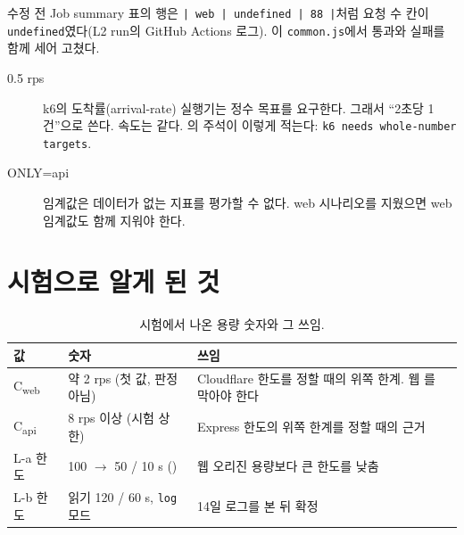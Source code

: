수정 전 Job summary 표의 행은 \texttt{| web | undefined | 88 |}처럼 요청 수 칸이 \texttt{undefined}였다(L2 run의 GitHub Actions 로그). 이 \texttt{common.js}에서 통과와 실패를 함께 세어 고쳤다.

\begin{description}
  \item[0.5 rps] k6의 도착률(arrival-rate) 실행기는 정수 목표를 요구한다. 그래서 ``2초당 1건''으로 쓴다. 속도는 같다. 의 주석이 이렇게 적는다: \texttt{k6 needs whole-number targets}.
  \item[ONLY=api] 임계값은 데이터가 없는 지표를 평가할 수 없다. web 시나리오를 지웠으면 web 임계값도 함께 지워야 한다.
\end{description}

\section{시험으로 알게 된 것}\label{sec:07-conclusions}

\begin{table}[H]
  \caption{시험에서 나온 용량 숫자와 그 쓰임.}\label{tab:07-capacity}
  \small
  \begin{tabularx}{\linewidth}{L{3.4cm} L{3.6cm} Y}
    \toprule
    값 & 숫자 & 쓰임 \\
    \midrule
    C\textsubscript{web} & 약 2 rps (첫 값, 판정 아님) & Cloudflare 한도를 정할 때의 위쪽 한계. 웹 를 막아야 한다 \\
    \midrule
    C\textsubscript{api} & 8 rps 이상 (시험 상한) & Express 한도의 위쪽 한계를 정할 때의 근거 \\
    \midrule
    L-a 한도 & 100 $\rightarrow$ 50 / 10 s () & 웹 오리진 용량보다 큰 한도를 낮춤 \\
    \midrule
    L-b 한도 & 읽기 120 / 60 s, \texttt{log} 모드 & 14일 로그를 본 뒤 확정 \\
    \bottomrule
  \end{tabularx}
\end{table}

